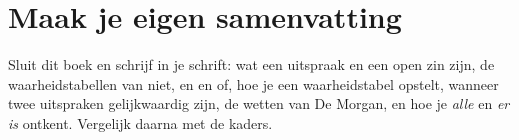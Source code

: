 
\ifzelfstudie
\section*{Maak je eigen samenvatting}
Sluit dit boek en schrijf in je schrift: wat een uitspraak en een open zin zijn, de waarheidstabellen van niet, en en of, hoe je een waarheidstabel opstelt, wanneer twee uitspraken gelijkwaardig zijn, de wetten van De Morgan, en hoe je \textit{alle} en \textit{er is} ontkent. Vergelijk daarna met de kaders.
\fi
